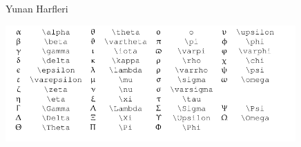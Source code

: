 \documentclass[12pt,fleqn]{article}\usepackage{../../common}
\begin{document}
Yunan Harfleri

\includegraphics[width=30em]{../../algs/zapp/letters.png}
\end{document}
